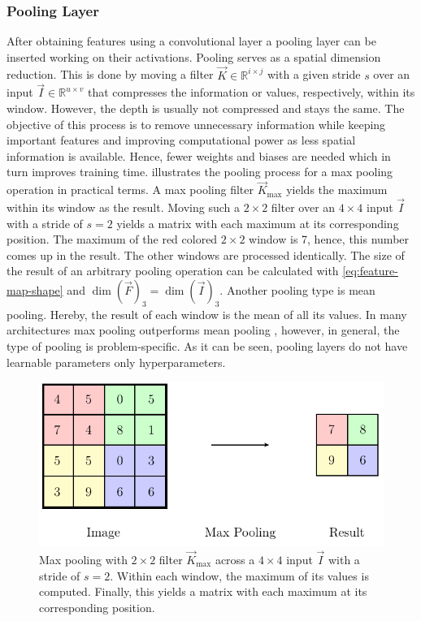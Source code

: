 \subsubsection{Pooling Layer}
\label{sec:cnn-pooling-layer}
After obtaining features using a convolutional layer a pooling layer can be inserted working on their activations.
Pooling serves as a spatial dimension reduction.
This is done by moving a filter $\vec{K} \in \mathbb{R}^{i \times j}$ with a given stride $s$ over an input $\vec{I} \in \mathbb{R}^{u \times v}$ that compresses the information or values, respectively, within its window.
However, the depth is usually not compressed and stays the same.
The objective of this process is to remove unnecessary information while keeping important features and improving computational power as less spatial information is available.
Hence, fewer weights and biases are needed which in turn improves training time.
 illustrates the pooling process for a max pooling operation in practical terms.
A max pooling filter $\vec{K}_{\text{max}}$ yields the maximum within its window as the result.
Moving such a $2 \times 2$ filter over an $4 \times 4$ input $\vec{I}$ with a stride of $s=2$ yields a matrix with each maximum at its corresponding position.
The maximum of the red colored $2 \times 2$ window is 7, hence, this number comes up in the result.
The other windows are processed identically.
The size of the result of an arbitrary pooling operation can be calculated with \eqref{eq:feature-map-shape} and $\dim \left( \vec{F} \right)_3 = \dim \left( \vec{I} \right)_3$.
Another pooling type is mean pooling.
Hereby, the result of each window is the mean of all its values.
In many architectures max pooling outperforms mean pooling \cite{Scherer2010}, however, in general, the type of pooling is problem-specific.
As it can be seen, pooling layers do not have learnable parameters only hyperparameters.
\begin{figure}
	\centering
	\includegraphics{images/pooling.pdf}
	\caption[Max pooling with $2 \times 2$ filter and stride $2$]{Max pooling with $2 \times 2$ filter $\vec{K}_{\text{max}}$ across a $4 \times 4$ input $\vec{I}$ with a stride of $s=2$. Within each window, the maximum of its values is computed. Finally, this yields a matrix with each maximum at its corresponding position.}
	\label{fig:pooling}
\end{figure}